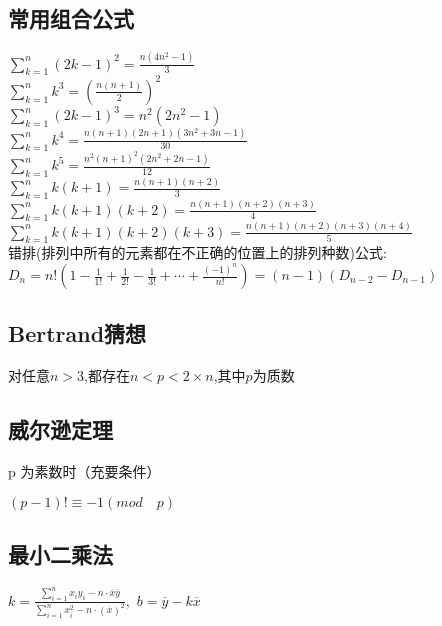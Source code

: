 \documentclass[twocolumn,a4]{article}
\begin{document}
\subsection{常用组合公式}
$\displaystyle \sum_{k=1}^{n}(2k-1)^{2}=\frac{n(4n^{2}-1)}{3}$\\
$\displaystyle \sum_{k=1}^{n}k^{3}=\left(\frac{n(n+1)}{2}\right)^{2}$\\
$\displaystyle \sum_{k=1}^{n}(2k-1)^{3}=n^{2}(2n^{2}-1)$\\
$\displaystyle \sum_{k=1}^{n}k^{4}=\frac{n(n+1)(2n+1)(3n^{2}+3n-1)}{30}$\\
$\displaystyle \sum_{k=1}^{n}k^{5}=\frac{n^{2}(n+1)^{2}(2n^{2}+2n-1)}{12}$\\
$\displaystyle \sum_{k=1}^{n}k(k+1)=\frac{n(n+1)(n+2)}{3}$\\
$\displaystyle \sum_{k=1}^{n}k(k+1)(k+2)=\frac{n(n+1)(n+2)(n+3)}{4}$\\
$\displaystyle \sum_{k=1}^{n}k(k+1)(k+2)(k+3)=\frac{n(n+1)(n+2)(n+3)(n+4)}{5}$\\
错排(排列中所有的元素都在不正确的位置上的排列种数)公式:\\
$D_{n}=n!\left(1-\frac{1}{1!}+\frac{1}{2!}-\frac{1}{3!}+\cdots+\frac{(-1)^{n}}{n!}\right)=(n-1)(D_{n-2}-D_{n-1})$\\

\subsection{Bertrand猜想}
对任意$n>3$,都存在$n<p<2\times n$,其中$p$为质数\\

\subsection{威尔逊定理}
p 为素数时（充要条件）\\
\begin{LARGE}
    $(p-1)!\equiv -1(mod\quad p)$
\end{LARGE}

\subsection{最小二乘法}
\begin{LARGE}
    $\displaystyle k=\frac{\sum_{i=1}^{n}x_{i}y_{i}-n\cdot\overline{x}\overline{y}}{\sum_{i=1}^{n}x_{i}^{2}-n\cdot (\overline{x})^{2}} ,$
    $b=\overline{y}-k\overline{x}$
\end{LARGE}
\end{document}
